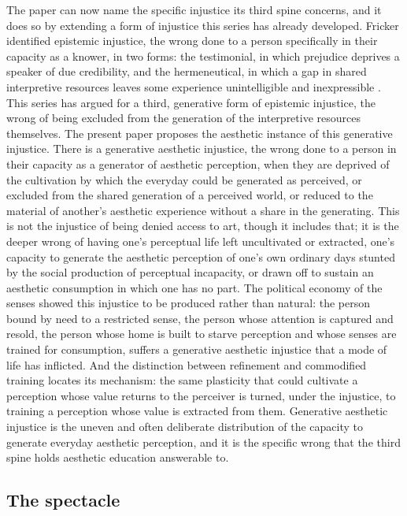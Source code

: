 The paper can now name the specific injustice its third spine concerns, and it does so by extending a form of injustice this series has already developed. Fricker identified epistemic injustice, the wrong done to a person specifically in their capacity as a knower, in two forms: the testimonial, in which prejudice deprives a speaker of due credibility, and the hermeneutical, in which a gap in shared interpretive resources leaves some experience unintelligible and inexpressible \parencite{fricker2007}. This series has argued for a third, generative form of epistemic injustice, the wrong of being excluded from the generation of the interpretive resources themselves. The present paper proposes the aesthetic instance of this generative injustice. There is a generative aesthetic injustice, the wrong done to a person in their capacity as a generator of aesthetic perception, when they are deprived of the cultivation by which the everyday could be generated as perceived, or excluded from the shared generation of a perceived world, or reduced to the material of another's aesthetic experience without a share in the generating. This is not the injustice of being denied access to art, though it includes that; it is the deeper wrong of having one's perceptual life left uncultivated or extracted, one's capacity to generate the aesthetic perception of one's own ordinary days stunted by the social production of perceptual incapacity, or drawn off to sustain an aesthetic consumption in which one has no part. The political economy of the senses showed this injustice to be produced rather than natural: the person bound by need to a restricted sense, the person whose attention is captured and resold, the person whose home is built to starve perception and whose senses are trained for consumption, suffers a generative aesthetic injustice that a mode of life has inflicted. And the distinction between refinement and commodified training locates its mechanism: the same plasticity that could cultivate a perception whose value returns to the perceiver is turned, under the injustice, to training a perception whose value is extracted from them. Generative aesthetic injustice is the uneven and often deliberate distribution of the capacity to generate everyday aesthetic perception, and it is the specific wrong that the third spine holds aesthetic education answerable to.

\subsection{The spectacle}
\label{p23:sub:dist-spectacle}

